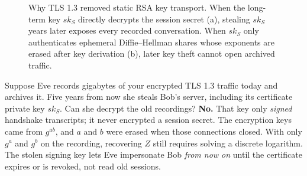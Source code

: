 \begin{figure}[htbp]
\centering
{}
\caption{Why TLS 1.3 removed static RSA key transport. When the long-term key $sk_S$ directly decrypts the session secret (a), stealing $sk_S$ years later exposes every recorded conversation. When $sk_S$ only authenticates ephemeral Diffie--Hellman shares whose exponents are erased after key derivation (b), later key theft cannot open archived traffic.}
\label{ch25:fig-forward-secrecy}
\end{figure}

\begin{intuitionbox}
Suppose Eve records gigabytes of your encrypted TLS 1.3 traffic today and archives
it. Five years from now she steals Bob's server, including its certificate private
key $sk_S$. Can she decrypt the old recordings? \textbf{No.} That key only
\emph{signed} handshake transcripts; it never encrypted a session secret. The
encryption keys came from $g^{ab}$, and $a$ and $b$ were erased when those
connections closed. With only $g^a$ and $g^b$ on the recording, recovering $Z$
still requires solving a discrete logarithm. The stolen signing key lets Eve
impersonate Bob \emph{from now on} until the certificate expires or is revoked,
not read old sessions.
\end{intuitionbox}

